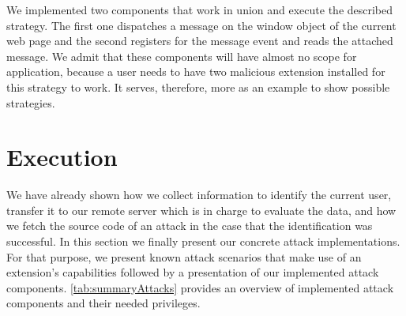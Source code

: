 	We implemented two components that work in union and execute the described strategy. The first one dispatches a message on the window object of the current web page and the second registers for the message event and reads the attached message. We admit that these components will have almost no scope for application, because a user needs to have two malicious extension installed for this strategy to work. It serves, therefore, more as an example to show possible strategies.


\clearpage
\section{Execution}
\label{sec:execution}

	We have already shown how we collect information to identify the current user, transfer it to our remote server which is in charge to evaluate the data, and how we fetch the source code of an attack in the case that the identification was successful. In this section we finally present our concrete attack implementations. For that purpose, we present known attack scenarios that make use of an extension's capabilities followed by a presentation of our implemented attack components. \autoref{tab:summaryAttacks} provides an overview of implemented attack components and their needed privileges.
	
